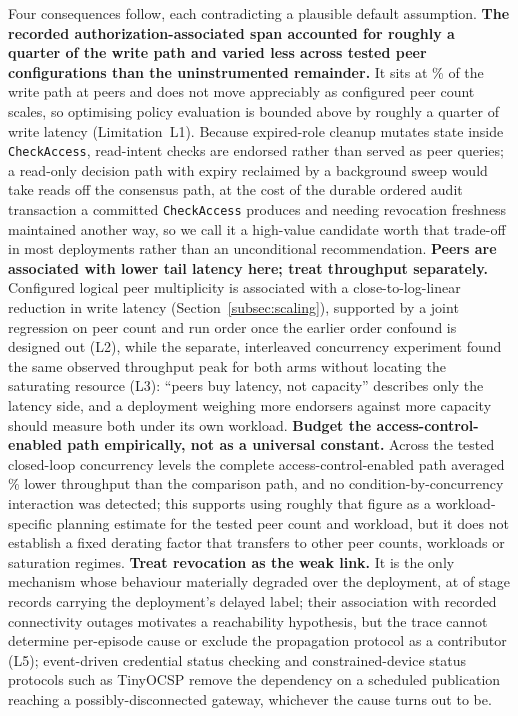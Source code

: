 \documentclass[a4paper,fleqn]{cas-sc}
\begin{document}
Four consequences follow, each contradicting a plausible default
assumption. \textbf{The recorded authorization-associated span accounted
for roughly a quarter of the write path and varied less across tested
peer configurations than the uninstrumented remainder.} It sits at
\PartAccessPct\% of the write path at \ScaleMinPeers{} peers and does not
move appreciably as configured peer count scales, so optimising policy
evaluation is bounded above by roughly a quarter of write latency
(Limitation~L1). Because expired-role cleanup
mutates state inside \texttt{CheckAccess}, read-intent checks are endorsed
rather than served as peer queries; a read-only decision path with expiry
reclaimed by a background sweep would take reads off the consensus path, at
the cost of the durable ordered audit transaction a committed
\texttt{CheckAccess} produces and needing revocation freshness maintained
another way, so we call it a high-value candidate worth that trade-off in
most deployments rather than an unconditional recommendation.
\textbf{Peers are associated with lower tail latency here; treat
throughput separately.} Configured logical peer multiplicity is associated
with a close-to-log-linear reduction in write latency
(Section~\ref{subsec:scaling}), supported by a joint regression on peer
count and run order once the earlier order confound is designed out
(L2), while the separate, interleaved concurrency experiment found the
same observed throughput peak for both arms without locating the
saturating resource (L3): ``peers buy latency, not capacity'' describes
only the latency side, and a deployment weighing more endorsers against
more capacity should measure both under its own workload.
\textbf{Budget the access-control-enabled path empirically, not as a
universal constant.} Across the tested closed-loop concurrency levels the
complete access-control-enabled path averaged \OverheadMeanPct\% lower
throughput than the comparison path, and no condition-by-concurrency
interaction was detected; this supports using roughly that figure as a
workload-specific planning estimate for the tested peer count and
workload, but it does not establish a fixed derating factor that transfers
to other peer counts, workloads or saturation regimes. \textbf{Treat
revocation as the weak link.} It is the only
mechanism whose behaviour materially degraded over the deployment, at
\RevDelayed{} of \RevEvents{} stage records carrying the deployment's
delayed label; their association with recorded connectivity outages
motivates a reachability hypothesis, but the trace cannot determine
per-episode cause or exclude the propagation protocol as a contributor
(L5); event-driven credential status checking
\cite{w3c_vc_status_list} and constrained-device status protocols such as
TinyOCSP \cite{fedrecheski2023tinyocsp} remove the dependency on a
scheduled publication reaching a possibly-disconnected gateway, whichever
the cause turns out to be.
\end{document}
